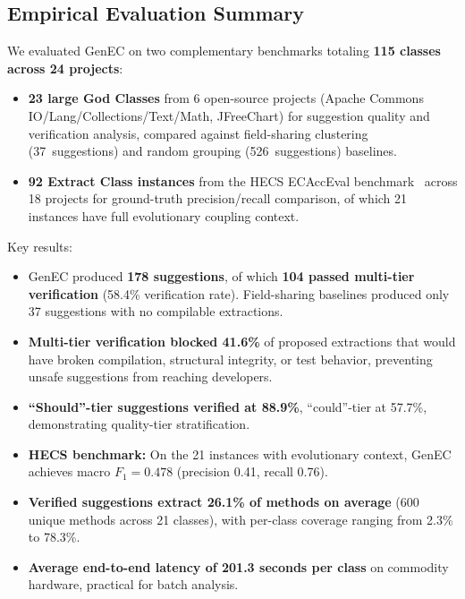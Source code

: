 \documentclass[sigconf]{acmart}
\begin{document}
\subsection{Empirical Evaluation Summary}
\label{sec:eval-summary}

We evaluated GenEC on two complementary benchmarks totaling \textbf{115 classes
across 24 projects}:
\begin{itemize}
  \item \textbf{23 large God Classes} from 6 open-source projects (Apache
        Commons IO/Lang/Collections/Text/Math, JFreeChart) for suggestion
        quality and verification analysis, compared against field-sharing
        clustering (37~suggestions) and random grouping (526~suggestions)
        baselines.
  \item \textbf{92 Extract Class instances} from the HECS ECAccEval
        benchmark~\cite{Cui2024HECS} across 18 projects for ground-truth
        precision/recall comparison, of which 21 instances have full
        evolutionary coupling context.
\end{itemize}

Key results:
\begin{itemize}
  \item GenEC produced \textbf{178 suggestions}, of which \textbf{104 passed
        multi-tier verification} (58.4\% verification rate). Field-sharing
        baselines produced only 37 suggestions with no compilable extractions.
  \item \textbf{Multi-tier verification blocked 41.6\%} of proposed
        extractions that would have broken compilation, structural integrity, or test behavior,
        preventing unsafe suggestions from reaching developers.
  \item \textbf{``Should''-tier suggestions verified at 88.9\%},
        ``could''-tier at 57.7\%, demonstrating quality-tier stratification.
  \item \textbf{HECS benchmark:} On the 21 instances with evolutionary
        context, GenEC achieves macro $F_1=0.478$ (precision 0.41, recall 0.76).
  \item \textbf{Verified suggestions extract 26.1\% of methods on average}
        (600 unique methods across 21 classes), with per-class coverage
        ranging from 2.3\% to 78.3\%.
  \item \textbf{Average end-to-end latency of 201.3 seconds per class} on
        commodity hardware, practical for batch analysis.
\end{itemize}
\end{document}
